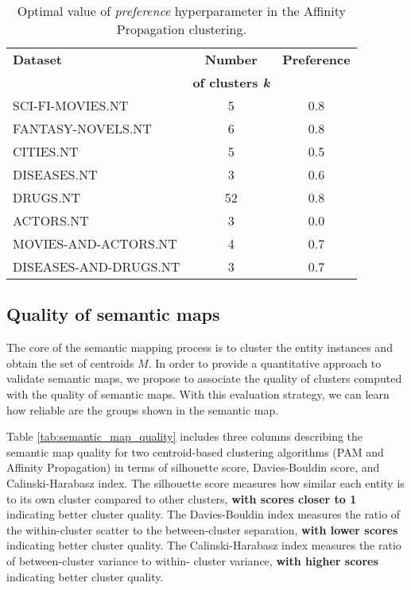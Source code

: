 \documentclass{ieeeaccess}
\begin{document}
\begin{table}[!htb]
    \caption{Optimal value of \textit{preference} hyperparameter 
    in the Affinity Propagation clustering.}
    \label{tab:preference_numbers}
    \centering
    \begin{tabular}{lcc}
         \toprule
         \textbf{Dataset} & 
         \textbf{Number} &
         \textbf{Preference}
         \\
         & \textbf{of clusters \textit{k}} & \\
         \midrule
         SCI-FI-MOVIES.NT & 5 & 0.8 \\ 
         FANTASY-NOVELS.NT & 6 & 0.8 \\
         CITIES.NT & 5 & 0.5 \\
         DISEASES.NT & 3 & 0.6 \\
         DRUGS.NT & 52 & 0.8 \\
         ACTORS.NT & 3 & 0.0 \\
         MOVIES-AND-ACTORS.NT & 4 & 0.7 \\
         DISEASES-AND-DRUGS.NT & 3 & 0.7 \\ 
         \bottomrule
    \end{tabular}
\end{table}

\subsection{Quality of semantic maps}

The core of the semantic mapping process is to cluster the entity instances
and obtain the set of centroids $M$. In order to provide a 
quantitative approach to validate semantic maps, we propose to associate the 
quality of clusters computed with the quality of semantic maps. With this 
evaluation strategy, we can learn how reliable are the groups shown in the 
semantic map.


Table \ref{tab:semantic_map_quality} includes three columns
describing the semantic map quality for two centroid-based 
clustering algorithms (PAM and Affinity Propagation) in terms of
silhouette score, Davies-Bouldin score, and Calinski-Harabasz 
index. The silhouette score measures how similar each entity
is to its own cluster compared to other clusters, \textbf{with
scores closer to 1} indicating better cluster quality. The 
Davies-Bouldin index measures the ratio of the within-cluster 
scatter to the between-cluster separation, \textbf{with lower
scores} indicating better cluster quality. The Calinski-Harabasz
index measures the ratio of between-cluster variance to within-
cluster variance, \textbf{with higher scores} indicating better 
cluster quality.
\end{document}
